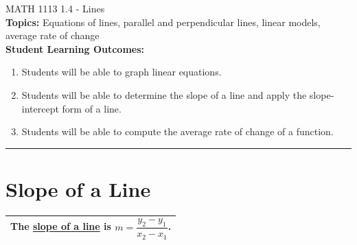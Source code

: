 \documentclass[11pt]{article}
\begin{document}
\noindent MATH 1113   \hfill 1.4 - Lines\\



\noindent \textbf{Topics:}  Equations of lines, parallel and perpendicular lines, linear models, average rate of change\\

\noindent \textbf{Student Learning Outcomes:}
\begin{enumerate}
\item Students will be able to graph linear equations.
\item Students will be able to determine the slope of a line and apply the slope-intercept form of a line.
\item Students will be able to compute the average rate of change of a function.
\end{enumerate}

\hrule 
\vspace{5mm}
\section{Slope of a Line}

\noindent 
\begin{tabular}{| l |} \hline
The \underline{slope of a line} is $m = \dfrac{y_2-y_1}{x_2-x_1}$.  \\ \hline
 \end{tabular} 
 
\end{document}
